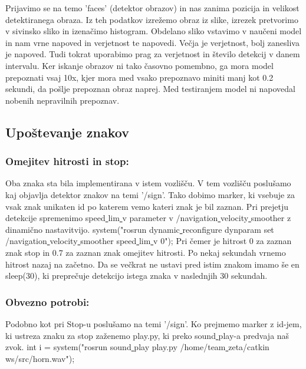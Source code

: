 \documentclass{llncs}
\begin{document}
Prijavimo se na temo 'faces' (detektor obrazov) in nas zanima pozicija in velikost detektiranega obraza. Iz teh podatkov izrežemo obraz iz slike, izrezek pretvorimo v sivinsko sliko in izenačimo histogram. Obdelano sliko vstavimo v naučeni model in nam vrne napoved in verjetnost te napovedi. Večja je verjetnost, bolj zanesliva je napoved. Tudi tokrat uporabimo prag za verjetnost in število detekcij v danem intervalu. Ker iskanje obrazov ni tako časovno pomembno, ga mora model prepoznati vsaj 10x, kjer mora med vsako prepoznavo miniti manj kot 0.2 sekundi, da pošlje prepoznan obraz naprej. Med testiranjem model ni napovedal nobenih nepravilnih prepoznav. 


\subsection{Upoštevanje znakov}
\subsubsection{Omejitev hitrosti in stop:}
Oba znaka sta bila implementirana v istem vozlišču. V tem vozlišču poslušamo kaj objavlja detektor znakov na temi '/sign'. Tako dobimo marker, ki vsebuje za vsak znak unikaten id po katerem vemo kateri znak je bil zaznan. Pri prejetju detekcije spremenimo speed\underline{ }lim\underline{ }v parameter v /navigation\underline{ }velocity\underline{ }smoother z dinamično nastavitvijo. 
system("rosrun dynamic\underline{ }reconfigure dynparam set /navigation\underline{ }velocity\underline{ }smoother speed\underline{ }lim\underline{ }v 0");
Pri čemer je hitrost 0 za zaznan znak stop in 0.7 za zaznan znak omejitev hitrosti. Po nekaj sekundah vrnemo hitrost nazaj na začetno. Da se večkrat ne ustavi pred istim znakom imamo še en sleep(30), ki preprečuje detekcijo istega znaka v naslednjih 30 sekundah.
\subsubsection{Obvezno potrobi:}
Podobno kot pri Stop-u poslušamo na temi '/sign'. Ko prejmemo marker z id-jem, ki ustreza znaku za stop zaženemo play.py, ki preko sound\underline{ }play-a predvaja naš zvok.
int i = system("rosrun sound\underline{ }play play.py /home/team\underline{ }zeta/catkin\underline{ }ws/src/horn.wav");
\end{document}
